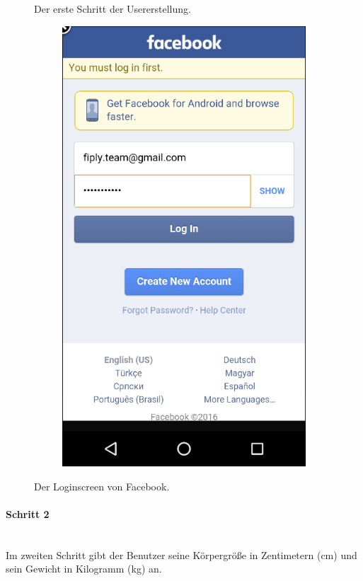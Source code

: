 \documentclass[FIPLY_base.tex]{subfiles}
\begin{document}
\begin{figure}[H]
\begin{subfigure}[b]{0.3\textwidth}
	\end{subfigure}
	\hfil
	\caption{Der erste Schritt der Usererstellung.}
	\begin{subfigure}[b]{0.3\textwidth}
	\includegraphics[scale=0.55]{img/User_facebooklogin}
	\end{subfigure}
	\hfil
	\caption{Der Loginscreen von Facebook.}
	
\end{figure}
\newpage
\paragraph{Schritt 2}\ \\
Im zweiten Schritt gibt der Benutzer seine Körpergröße in Zentimetern (cm) und sein Gewicht in Kilogramm (kg) an.
\end{document}
